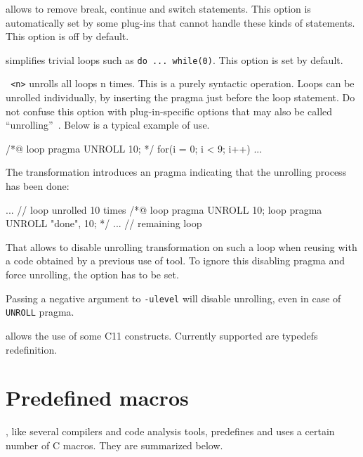 \begin{description}
\item {} allows \FramaC to remove break, continue and
  switch statements. This option is automatically set by some plug-ins that
  cannot handle these kinds of statements. This option is off by default.

\item {} simplifies trivial loops such as
  \texttt{do ... while(0)}. This option is set by default.

\item \texttt{ <n>} unrolls all loops n times. This is a
  purely syntactic operation.  Loops can be unrolled individually, by
  inserting the  pragma just before the loop statement. Do
  not confuse this option with plug-in-specific options that may also be called
  ``unrolling''~\cite{value}. Below is a typical example of use.
\begin{ccode}
/*@ loop pragma UNROLL 10; */
for(i = 0; i < 9; i++) ...
\end{ccode}
The transformation introduces an  pragma indicating that the unrolling process has been done:
\begin{ccode}
... // loop unrolled 10 times
/*@ loop pragma UNROLL 10;
    loop pragma UNROLL "done", 10; */
  ... // remaining loop
\end{ccode}
That allows to disable unrolling transformation on such a loop when reusing \FramaC with a code obtained by a previous use of \FramaC tool.
To ignore this disabling  pragma and force unrolling, the option \texttt{} has to be set.

Passing a negative argument to \texttt{-ulevel} will disable unrolling, even
in case of \texttt{UNROLL} pragma.

\item {} allows the use of some C11 constructs. Currently
supported are typedefs redefinition.
\end{description}

\section{Predefined macros}\label{sec:predefined-macros}

\FramaC, like several compilers and code analysis tools, predefines and uses
a certain number of C macros. They are summarized below.

